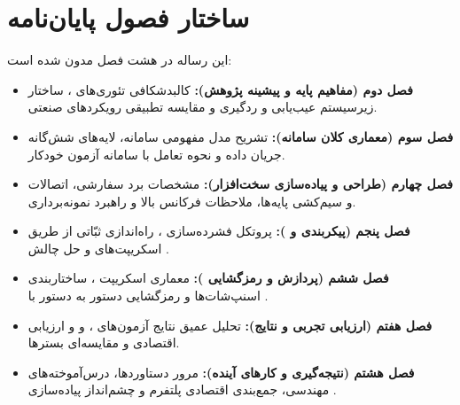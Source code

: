 \section{ساختار فصول پایان‌نامه}
این رساله در هشت فصل مدون شده است:
\begin{itemize}\setlength{\itemsep}{0.4em}
    \item \textbf{فصل دوم (مفاهیم پایه و پیشینه پژوهش):} کالبدشکافی تئوری‌های ، ساختار زیرسیستم عیب‌یابی و ردگیری  و مقایسه تطبیقی رویکردهای صنعتی.
    \item \textbf{فصل سوم (معماری کلان سامانه):} تشریح مدل مفهومی سامانه، لایه‌های شش‌گانه جریان داده و نحوه تعامل با سامانه آزمون خودکار.
    \item \textbf{فصل چهارم (طراحی و پیاده‌سازی سخت‌افزار):} مشخصات برد سفارشی، اتصالات و سیم‌کشی پایه‌ها، ملاحظات فرکانس بالا و راهبرد نمونه‌برداری.
    \item \textbf{فصل پنجم (پیکربندی  و ):} پروتکل فشرده‌سازی ، راه‌اندازی ثبّاتی از طریق اسکریپت‌های  و حل چالش .
    \item \textbf{فصل ششم (پردازش و رمزگشایی ):} معماری اسکریپت ، ساختاربندی اسنپ‌شات‌ها و رمزگشایی دستور به دستور با .
    \item \textbf{فصل هفتم (ارزیابی تجربی و نتایج):} تحلیل عمیق نتایج آزمون‌های ،  و  و ارزیابی اقتصادی و مقایسه‌ای بسترها.
    \item \textbf{فصل هشتم (نتیجه‌گیری و کارهای آینده):} مرور دستاوردها، درس‌آموخته‌های مهندسی، جمع‌بندی اقتصادی پلتفرم و چشم‌انداز پیاده‌سازی .
\end{itemize}
